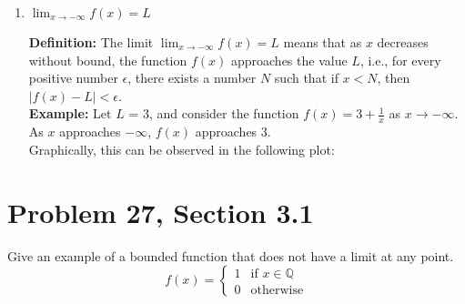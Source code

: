 \documentclass[12pt]{article}
\begin{document}
\begin{enumerate}[label=(\alph*)]
    \item $\lim_{x \to -\infty}f(x) = L$
    
      \textbf{Definition:} The limit $\lim_{x \to -\infty}f(x) = L$ means that as $x$ decreases without bound, the function $f(x)$ approaches the value $L$, i.e., for every positive number $\epsilon$, there exists a number $N$ such that if $x < N$, then $|f(x) - L| < \epsilon$.
      \\
      \textbf{Example:} Let $L$ = 3, and consider the function $f(x) = 3 + \frac{1}{x}$ as $x \to -\infty$. As $x$ approaches $-\infty$, $f(x)$ approaches 3.
      \\
      Graphically, this can be observed in the following plot:
      
  \end{enumerate}
  \newpage



  \section*{Problem 27, Section 3.1}
  Give an example of a bounded function that does not have a limit at any point.
  \[
  f(x) = \begin{cases}
      1 & \text{if } x \in \mathbb{Q} \\
      0 & \text{otherwise}
  \end{cases}
  \]
  \newpage
\end{document}
